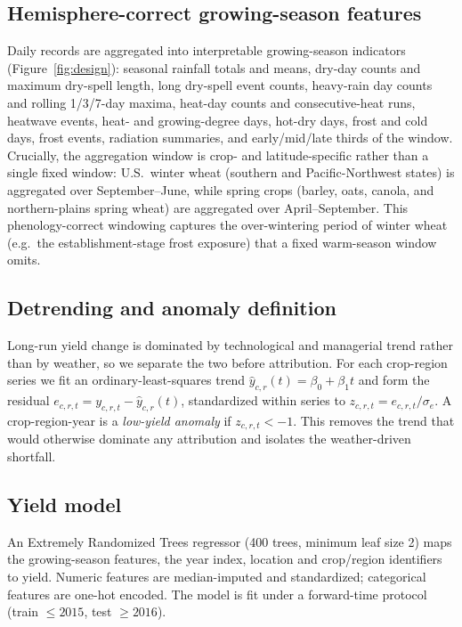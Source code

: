 \documentclass[11pt]{article}
\begin{document}
\subsection{Hemisphere-correct growing-season features}
\label{sec:fe}
Daily records are aggregated into interpretable growing-season indicators
(Figure~\ref{fig:design}): seasonal rainfall totals and means, dry-day counts and
maximum dry-spell length, long dry-spell event counts, heavy-rain day counts and
rolling 1/3/7-day maxima, heat-day counts and consecutive-heat runs, heatwave events,
heat- and growing-degree days, hot-dry days, frost and cold days, frost events,
radiation summaries, and early/mid/late thirds of the window. Crucially, the
aggregation window is crop- and latitude-specific rather than a single fixed window:
U.S.\ winter wheat (southern and Pacific-Northwest states) is aggregated over
September--June, while spring crops (barley, oats, canola, and northern-plains spring
wheat) are aggregated over April--September. This phenology-correct windowing captures
the over-wintering period of winter wheat (e.g.\ the establishment-stage frost
exposure) that a fixed warm-season window omits.

\subsection{Detrending and anomaly definition}
\label{sec:detrend}
Long-run yield change is dominated by technological and managerial trend rather than by
weather, so we separate the two before attribution. For each crop-region series we fit
an ordinary-least-squares trend $\hat y_{c,r}(t)=\beta_0+\beta_1 t$ and form the
residual $e_{c,r,t}=y_{c,r,t}-\hat y_{c,r}(t)$, standardized within series to
$z_{c,r,t}=e_{c,r,t}/\sigma_{e}$. A crop-region-year is a \emph{low-yield anomaly} if
$z_{c,r,t}<-1$. This removes the trend that would otherwise dominate any attribution and
isolates the weather-driven shortfall.

\subsection{Yield model}
\label{sec:model}
An Extremely Randomized Trees regressor (400 trees, minimum leaf size 2) maps the
growing-season features, the year index, location and crop/region identifiers to yield.
Numeric features are median-imputed and standardized; categorical features are one-hot
encoded. The model is fit under a forward-time protocol (train $\le2015$, test
$\ge2016$).
\end{document}
